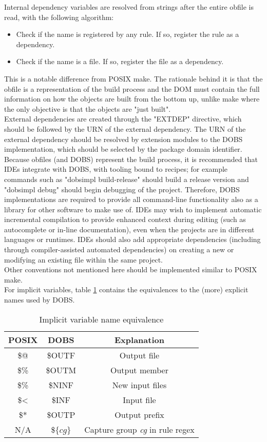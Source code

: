 Internal dependency variables are resolved from strings after the entire obfile is read, with the following algorithm:
\begin{itemize}
	\item Check if the name is registered by any rule. If so, register the rule as a dependency.
	\item Check if the name is a file. If so, register the file as a dependency.
\end{itemize}
This is a notable difference from POSIX make. The rationale behind it is that the obfile is a representation of the build process and the DOM must contain the full information on how the objects are built from the bottom up, unlike make where the only objective is that the objects are "just built".\\
External dependencies are created through the "EXTDEP" directive, which should be followed by the URN of the external dependency. The URN of the external dependency should be resolved by extension modules to the DOBS implementation, which should be selected by the package domain identifier.\\
Because obfiles (and DOBS) represent the build process, it is recommended that IDEs integrate with DOBS, with tooling bound to recipes; for example commands such as "dobsimpl build-release" should build a release version and "dobsimpl debug" should begin debugging of the project. Therefore, DOBS implementations are required to provide all command-line functionality also as a library for other software to make use of. IDEs may wish to implement automatic incremental compilation to provide enhanced context during editing (such as autocomplete or in-line documentation), even when the projects are in different languages or runtimes. IDEs should also add appropriate dependencies (including through compiler-assisted automated dependencies) on creating a new or modifying an existing file within the same project.\\
Other conventions not mentioned here should be implemented similar to POSIX make.\\
For implicit variables, table \ref{tab:dobs-implicit-equivalence} contains the equivalences to the (more) explicit names used by DOBS.\\
\begin{table}[h]
	\centering
	\begin{tabular}{|c|c|c|}
		\hline
		POSIX & DOBS & Explanation\\
		\hline
		\$@ & \$OUTF & Output file\\
		\$\% & \$OUTM & Output member\\
		\$\% & \$NINF & New input files\\
		\$< & \$INF & Input file\\
		\$* & \$OUTP & Output prefix\\
		N/A & \$$\lbrace cg \rbrace$ & Capture group \textit{cg} in rule regex\\
		\hline
	\end{tabular}
	\caption{Implicit variable name equivalence}
	\label{tab:dobs-implicit-equivalence}
\end{table}
